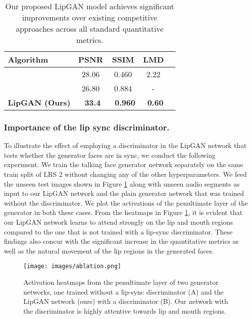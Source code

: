 \documentclass[sigconf]{acmart}
\begin{document}
\begin{table}[h]
  \begin{tabular}{l|cccc}
    \hline
    Algorithm & PSNR & SSIM & LMD \\
    \hline
    \citet{chung2017you}& 28.06 & 0.460 & 2.22\\
    \citet{zhou2018talking} & 26.80 & 0.884 & - \\
    \textbf{LipGAN (Ours)} & ~\textbf{33.4} & ~\textbf{0.960} & ~\textbf{0.60}\\
  \bottomrule
 \end{tabular}
  \caption{Our proposed LipGAN model achieves significant improvements over existing competitive approaches across all standard quantitative metrics.}
  \label{tab:lipgan_quant}
  \vspace{-0.7cm}
\end{table}

\subsubsection{Importance of the lip sync discriminator.} To illustrate the effect of employing a discriminator in the LipGAN network that tests whether the generator faces are in sync, we conduct the following experiment. We train the talking face generator network separately on the same train split of LRS 2 without changing any of the other hyperparameters. We feed the unseen test images shown in Figure \ref{fig:ablation} along with unseen audio segments as input to our LipGAN network and the plain generator network that was trained without the discriminator. We plot the activations of the penultimate layer of the generator in both these cases. From the heatmaps in Figure \ref{fig:ablation}, it is evident that our LipGAN network learns to attend strongly on the lip and mouth regions compared to the one that is not trained with a lip-sync discriminator. These findings also concur with the significant increase in the quantitative metrics as well as the natural movement of the lip regions in the generated faces.

\begin{figure}[h]
  \texttt{[image: images/ablation.png]}
  \caption{Activation heatmaps from the penultimate layer of two generator networks, one trained without a lip-sync discriminator (A) and the LipGAN network (ours) with a discriminator (B). Our network with the discriminator is highly attentive towards lip and mouth regions.}
  \label{fig:ablation}
  \vspace{-0.3cm}
\end{figure}
\end{document}
